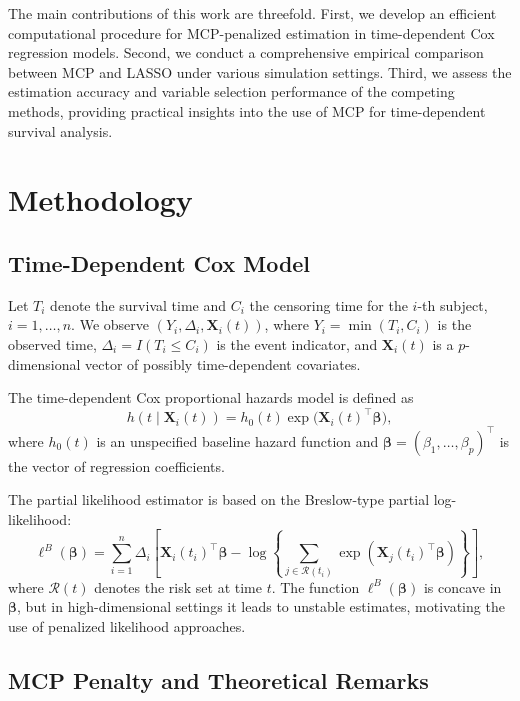 \documentclass[twoside]{article}
\begin{document}
The main contributions of this work are threefold. First, we develop an efficient computational procedure for MCP-penalized estimation in time-dependent Cox regression models. Second, we conduct a comprehensive empirical comparison between MCP and LASSO under various simulation settings. Third, we assess the estimation accuracy and variable selection performance of the competing methods, providing practical insights into the use of MCP for time-dependent survival analysis.


\section{Methodology}

\subsection{Time-Dependent Cox Model}
Let $T_i$ denote the survival time and $C_i$ the censoring time for the $i$-th subject, $i = 1, \ldots, n$. We observe $(Y_i, \Delta_i, \boldsymbol{X}_i(t))$, where $Y_i = \min(T_i, C_i)$ is the observed time, $\Delta_i = I(T_i \leq C_i)$ is the event indicator, and $\boldsymbol{X}_i(t)$ is a $p$-dimensional vector of possibly time-dependent covariates.

The time-dependent Cox proportional hazards model is defined as
\[
h(t \mid \boldsymbol{X}_i(t)) = h_0(t)\exp\big(\boldsymbol{X}_i(t)^\top \boldsymbol{\beta}\big),
\]
where $h_0(t)$ is an unspecified baseline hazard function and $\boldsymbol{\beta} = (\beta_1, \ldots, \beta_p)^\top$ is the vector of regression coefficients.

The partial likelihood estimator is based on the Breslow-type partial log-likelihood:
\[
\ell^{B}(\boldsymbol{\beta})
=
\sum_{i=1}^{n}
\Delta_i
\left[
\boldsymbol{X}_i(t_i)^\top\boldsymbol{\beta}
-
\log
\left\{
\sum_{j\in\mathcal{R}(t_i)}
\exp\left(
\boldsymbol{X}_j(t_i)^\top\boldsymbol{\beta}
\right)
\right\}
\right],
\]
where $\mathcal{R}(t)$ denotes the risk set at time $t$. The function $\ell^{B}(\boldsymbol{\beta})$ is concave in $\boldsymbol{\beta}$, but in high-dimensional settings it leads to unstable estimates, motivating the use of penalized likelihood approaches.




\subsection{MCP Penalty and Theoretical Remarks}
\label{subsec:mcp_theory}
\end{document}
